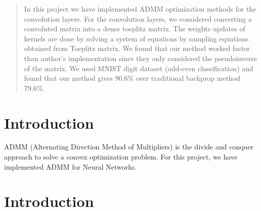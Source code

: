 \documentclass[12pt]{article}
\begin{document}
\maketitle

\begin{abstract}
In this project we have implemented ADMM optimization methods for the convolution layers.
For the convolution layers, we considered converting a convoluted matrix into a dense toeplitz matrix.
The weights updates of kernels are done by solving a system of equations by sampling equations obtained from Toeplitz matrix.
We found that our method worked faster than author's implementation since they only considered the pseudoinverse of the matrix.
We used MNIST digit dataset (odd-even classification) and found that our method gives 90.6\% over traditional backprop method 79.6\%.
\end{abstract}

\section{Introduction}
ADMM (Alternating Direction Method of Multipliers) is the divide and conquer approach to solve a convex optimization problem.
For this project, we have implemented ADMM for Neural Networks.

\section{Introduction}



\end{document}
